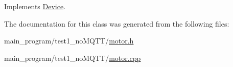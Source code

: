 Implements \hyperlink{class_device_aab20e3f9dc696c6a1153776d526dcc0b}{Device}.



The documentation for this class was generated from the following files\+:\begin{DoxyCompactItemize}
\item 
main\+\_\+program/test1\+\_\+no\+M\+Q\+T\+T/\hyperlink{test1__no_m_q_t_t_2motor_8h}{motor.\+h}\item 
main\+\_\+program/test1\+\_\+no\+M\+Q\+T\+T/\hyperlink{test1__no_m_q_t_t_2motor_8cpp}{motor.\+cpp}\end{DoxyCompactItemize}

